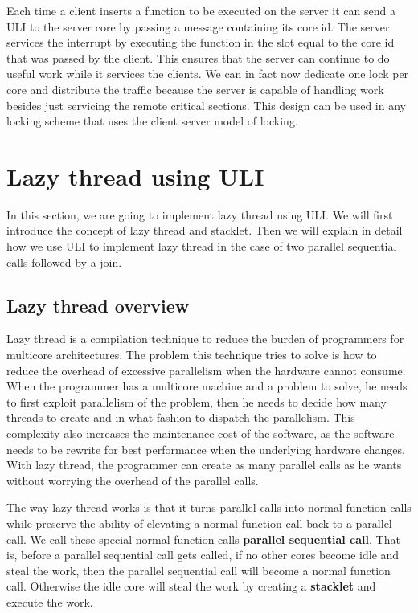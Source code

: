Each time a client inserts a function to be executed on the server it can send a
ULI to the server core by passing a message containing its core id. The server
services the interrupt by executing the function in the slot equal to the core
id that was passed by the client. This ensures that the server can continue to
do useful work while it services the clients. We can in fact now dedicate one
lock per core and distribute the traffic because the server is capable of
handling work besides just servicing the remote critical sections. This design
can be used in any locking scheme that uses the client server model of locking.

\section{Lazy thread using ULI}

In this section, we are going to implement lazy thread \cite{goldstein} using ULI. We will first introduce the concept of lazy thread and stacklet. Then we will explain in detail how we use ULI to implement lazy thread in the case of two parallel sequential calls followed by a join.

\subsection{Lazy thread overview}
Lazy thread is a compilation technique to reduce the burden of programmers for multicore architectures. The problem this technique tries to solve is how to reduce the overhead of excessive parallelism when the hardware cannot consume. When the programmer has a multicore machine and a problem to solve, he needs to first exploit parallelism of the problem, then he needs to decide how many threads to create and in what fashion to dispatch the parallelism. This complexity also increases the maintenance cost of the software, as the software needs to be rewrite for best performance when the underlying hardware changes. With lazy thread, the programmer can create as many parallel calls as he wants without worrying the overhead of the parallel calls.

The way lazy thread works is that it turns parallel calls into normal function calls while preserve the ability of elevating a normal function call back to a parallel call. We call these special normal function calls \textbf{parallel sequential call}. That is, before a parallel sequential call gets called, if no other cores become idle and steal the work, then the parallel sequential call will become a normal function call. Otherwise the idle core will steal the work by creating a \textbf{stacklet} and execute the work.

